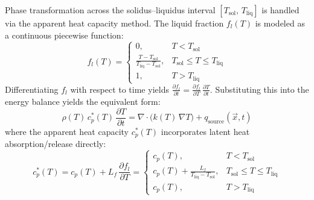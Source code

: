 \documentclass[10pt,a4paper]{article}
\begin{document}
Phase transformation across the solidus--liquidus interval $[T_{\mathrm{sol}},\,T_{\mathrm{liq}}]$ is handled via the apparent heat capacity method. The liquid fraction $f_l(T)$ is modeled as a continuous piecewise function:
\begin{equation}
f_l(T) = \begin{cases}
0, & T < T_{\mathrm{sol}} \\
\displaystyle \frac{T - T_{\mathrm{sol}}}{T_{\mathrm{liq}} - T_{\mathrm{sol}}}, & T_{\mathrm{sol}} \le T \le T_{\mathrm{liq}} \\
1, & T > T_{\mathrm{liq}}
\end{cases}
\end{equation}
Differentiating $f_l$ with respect to time yields $\frac{\partial f_l}{\partial t} = \frac{\partial f_l}{\partial T}\,\frac{\partial T}{\partial t}$. Substituting this into the energy balance yields the equivalent form:
\begin{equation}
\rho(T)\,c_p^*(T)\,\frac{\partial T}{\partial t} = \nabla \cdot \bigl(k(T)\,\nabla T\bigr) + q_{\mathrm{source}}(\vec{x}, t)
\end{equation}
where the apparent heat capacity $c_p^*(T)$ incorporates latent heat absorption/release directly:
\begin{equation}
c_p^*(T) = c_p(T) + L_f\,\frac{\partial f_l}{\partial T} = \begin{cases}
c_p(T), & T < T_{\mathrm{sol}} \\[4pt]
c_p(T) + \displaystyle \frac{L_f}{T_{\mathrm{liq}} - T_{\mathrm{sol}}}, & T_{\mathrm{sol}} \le T \le T_{\mathrm{liq}} \\[8pt]
c_p(T), & T > T_{\mathrm{liq}}
\end{cases}
\end{equation}
\end{document}
